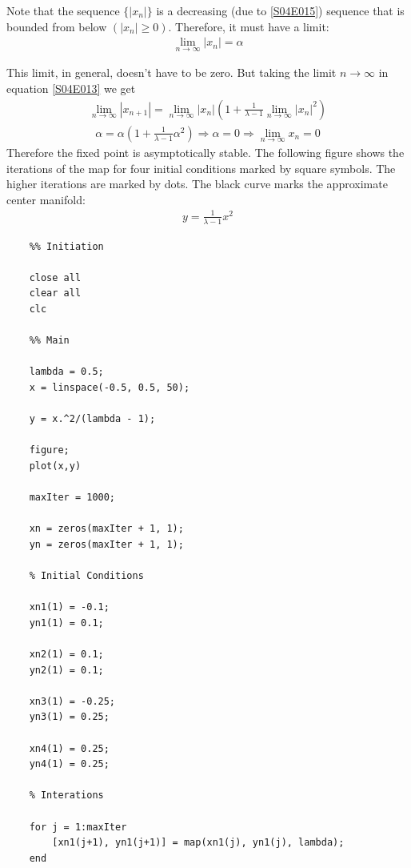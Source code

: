 \begin{solution}[4.1]
\begin{enumerate}
Note that the sequence $\{|x_n|\}$ is a decreasing (due to \eqref{S04E015}) sequence that is bounded from below $(|x_n| \geq 0)$. Therefore, it must have a limit:
\begin{align}
	\lim_{n \rightarrow \infty} |x_n| = \alpha
\end{align}

This limit, in general, doesn't have to be zero. But taking the limit $n \rightarrow \infty$ in equation \eqref{S04E013} we get
\begin{align}
	\lim_{n \rightarrow \infty} |x_{n+1}| = \lim_{n \rightarrow \infty}
	|x_n| \left( 1 + \frac{1}{\lambda - 1} \lim_{n \rightarrow \infty} |x_n|^2 \right)
\end{align}
\begin{align}
	\alpha = \alpha \left( 1 + \frac{1}{\lambda - 1} \alpha^2 \right) \Longrightarrow \alpha = 0 \Longrightarrow \lim_{n \rightarrow \infty} x_n = 0
\end{align}
Therefore the fixed point is asymptotically stable.
\vspace{15 pt}
The following figure shows the iterations of the map for four initial conditions marked by square symbols. The higher iterations are marked by dots. The black curve marks the approximate center manifold:
\begin{align}
	y = \frac{1}{\lambda - 1}x^2
\end{align}


\begin{verbatim}
	%% Initiation

	close all
	clear all
	clc

	%% Main

	lambda = 0.5;
	x = linspace(-0.5, 0.5, 50);
	
	y = x.^2/(lambda - 1);
	
	figure;
	plot(x,y)
	
	maxIter = 1000;
	
	xn = zeros(maxIter + 1, 1);
	yn = zeros(maxIter + 1, 1);
	
	% Initial Conditions
	
	xn1(1) = -0.1;
	yn1(1) = 0.1;
	
	xn2(1) = 0.1;
	yn2(1) = 0.1;
	
	xn3(1) = -0.25;
	yn3(1) = 0.25;
	
	xn4(1) = 0.25;
	yn4(1) = 0.25;
	
	% Interations
	
	for j = 1:maxIter
	    [xn1(j+1), yn1(j+1)] = map(xn1(j), yn1(j), lambda);
	end
	

\end{verbatim}
\end{enumerate}
\end{solution}
